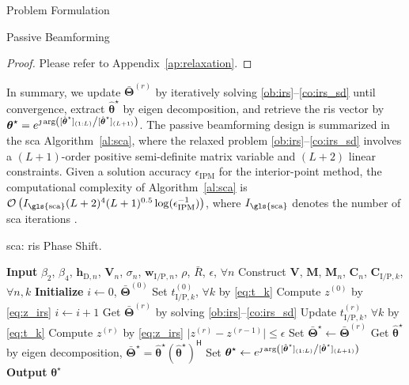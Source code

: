 \begin{section}{Problem Formulation}
\begin{subsection}{Passive Beamforming}
		\begin{proof}\label{pf:relaxation}
			Please refer to Appendix~\ref{ap:relaxation}.
		\end{proof}

		In summary, we update $\bar{\mathbf{\Theta}}^{(r)}$ by iteratively solving \eqref{ob:irs}--\eqref{co:irs_sd} until convergence, extract $\hat{\boldsymbol{\theta}}^\star$ by eigen decomposition, and retrieve the \gls{ris} vector by $\boldsymbol{\theta}^{\star}=e^{\jmath  \arg\left([\hat{\boldsymbol{\theta}}^\star]_{(1:L)} \middle/ [\hat{\boldsymbol{\theta}}^\star]_{(L+1)}\right)}$. The passive beamforming design is summarized in the \gls{sca} Algorithm~\ref{al:sca}, where the relaxed problem \eqref{ob:irs}--\eqref{co:irs_sd} involves a $(L+1)$-order positive semi-definite matrix variable and $(L+2)$ linear constraints. Given a solution accuracy $\epsilon_{\mathrm{IPM}}$ for the interior-point method, the computational complexity of Algorithm~\ref{al:sca} is $\mathcal{O}\left(I_{\mathrm{\gls{sca}}}(L+2)^4 (L+1)^{0.5} \log(\epsilon_{\mathrm{IPM}}^{-1})\right)$, where $I_{\mathrm{\gls{sca}}}$ denotes the number of \gls{sca} iterations \cite{Luo2010b}.

		\begin{algorithm}[!t]
			\caption{\gls{sca}: \gls{ris} Phase Shift.}
			\label{al:sca}
			\begin{algorithmic}[1]
				\State \textbf{Input} $\beta_2$, $\beta_4$, $\mathbf{h}_{\mathrm{D},n}$, $\mathbf{V}_{n}$, $\sigma_n$, $\mathbf{w}_{\mathrm{I/P},n}$, $\rho$, $\bar{R}$, $\epsilon$, $\forall n$
				\State Construct $\mathbf{V}$, $\mathbf{M}$, $\mathbf{M}_n$, $\mathbf{C}_{n}$, $\mathbf{C}_{\mathrm{I/P},k}$, $\forall n,k$
				\State \textbf{Initialize} $i \gets 0$, $\bar{\mathbf{\Theta}}^{(0)}$
				\State Set $t_{\mathrm{I/P},k}^{(0)}$, $\forall k$ by \eqref{eq:t_k}
				\State Compute $z^{(0)}$ by \eqref{eq:z_irs}
				\Repeat
					\State $i \gets i + 1$
					\State Get $\bar{\mathbf{\Theta}}^{(r)}$ by solving \eqref{ob:irs}--\eqref{co:irs_sd}
					\State Update $t_{\mathrm{I/P},k}^{(r)}$, $\forall k$ by \eqref{eq:t_k}
					\State Compute $z^{(r)}$ by \eqref{eq:z_irs}
				\Until $\lvert z^{(r)}-z^{(r-1)} \rvert \le \epsilon$
				\State Set $\bar{\mathbf{\Theta}}^{\star} \gets \bar{\mathbf{\Theta}}^{(r)}$
				\State Get $\hat{\boldsymbol{\theta}}^\star$ by eigen decomposition, $\bar{\mathbf{\Theta}}^{\star}=\hat{\boldsymbol{\theta}}^\star(\hat{\boldsymbol{\theta}}^\star)^\mathsf{H}$
				\State Set $\boldsymbol{\theta}^{\star} \gets e^{\jmath  \arg\left([\hat{\boldsymbol{\theta}}^\star]_{(1:L)} \middle/ [\hat{\boldsymbol{\theta}}^\star]_{(L+1)}\right)}$
				\State \textbf{Output} $\boldsymbol{\theta}^{\star}$
			\end{algorithmic}
		\end{algorithm}


\end{subsection}
\end{section}
